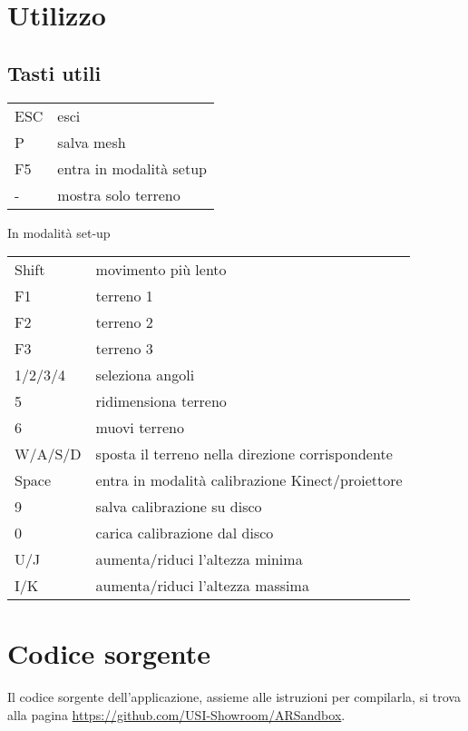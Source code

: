 \documentclass[12pt]{article}
\begin{document}
		
\newpage
\section{Utilizzo}

	\subsection{Tasti utili}
	
	\begin{tabular}{l l}
		ESC & esci\\
		P & salva mesh\\
		F5 & entra in modalità setup\\
		- & mostra solo terreno\\
	\end{tabular}

	In modalità set-up

	\begin{tabular}{l l}
		Shift & movimento più lento\\

		F1 & terreno 1\\
		F2 & terreno 2\\
		F3 & terreno 3\\

		1/2/3/4 & seleziona angoli\\
		5 & ridimensiona terreno\\
		6 & muovi terreno\\

		W/A/S/D & sposta il terreno nella direzione corrispondente\\

		Space & entra in modalità calibrazione Kinect/proiettore\\

		9 & salva calibrazione su disco\\
		0 & carica calibrazione dal disco\\

		U/J & aumenta/riduci l'altezza minima\\
		I/K & aumenta/riduci l'altezza massima\\
	\end{tabular}
		
		
\section{Codice sorgente}

	Il codice sorgente dell'applicazione, assieme alle istruzioni per compilarla, si trova alla pagina \url{https://github.com/USI-Showroom/ARSandbox}.
		
	
\end{document}
